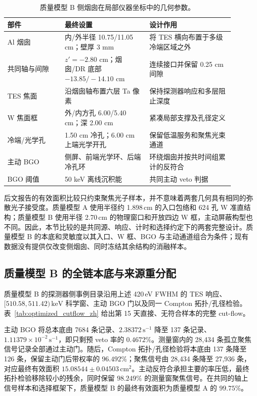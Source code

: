 \documentclass[11pt]{article}
\newcommand{\revblue}[1]{\textcolor{revisionblue}{#1}}
\newcommand{\keV}{\,\mathrm{keV}}
\newcommand{\cps}{\,\mathrm{s^{-1}}}
\begin{document}
\begin{table}[!ht]
\centering
\caption{质量模型 B 侧烟囱在局部仪器坐标中的几何参数。}
\label{tab:final_geometry_zh}
\footnotesize
\begin{tabular}{p{0.23\linewidth}p{0.34\linewidth}p{0.34\linewidth}}
\toprule
部件 & 最终设置 & 设计作用 \\
\midrule
Al 烟囱 & 内/外半径 10.75/11.05 cm；壁厚 3 mm & 将 TES 横向布置于多级冷端区域之外 \\
共同轴与间隙 & $z'=-2.80$ cm；烟囱/DR 底部 $-13.85/-14.10$ cm & 连续接口并保留 0.25 cm 间隙 \\
TES 焦面 & 沿烟囱轴布置六层 Ta 像素 & 保持探测器响应和多层阻止深度 \\
W 焦面框 & 外/内方孔 6.00/5.40 cm；深 2.00 cm & 紧凑局部支撑及孔径定义 \\
冷端/光学孔 & 1.50 cm 冷孔；6.00 cm 上端光学开孔 & 保留低温服务和聚焦光束通道 \\
主动 BGO & 侧屏、前端光学环、后端冷孔环 & 环绕烟囱并按共时间组累计的反符合 \\
BGO 阈值 & 50 keV 离线沉积能 & 共同主动 veto 判据 \\
\bottomrule
\end{tabular}
\end{table}

\revblue{后文报告的有效面积比较只约束聚焦光子样本}，并不意味着两套几何具有相同的弥散光子接受度。质量模型 A 使用半径约 1.898\,cm 的入口包络和 624 孔 W 准直结构；质量模型 B 使用半径 2.70\,cm 的物理窗口和开放四边 W 框，主动屏蔽构型也不同。因此，本节比较的是共同源、响应、计时和选择约定下的两套完整设计。质量模型 B 的本底和灵敏度以其入口、W 框、BGO 与主动通道组合为条件；现有数据没有提供仅改变侧烟囱、同时冻结其余结构的消融样本。

\FloatBarrier

\subsection{质量模型 B 的全链本底与来源重分配}
\label{subsec:optimized_fullchain_zh}

质量模型 B 的探测器侧事例目录沿用上述 420\,eV FWHM 的 TES 响应、$[510.58,511.42)\keV$ 科学窗、主动 BGO 门以及同一 Compton 拓扑/孔径检验。表~\ref{tab:optimized_cutflow_zh} 给出第 15 天直接、无符合样本的完整 cut-flow。

主动 BGO 将总本底由 7684 条记录、$2.38372\cps$ 降至 137 条记录、$1.11379\times10^{-2}\cps$，即只剩预 veto 率的 $0.4672\%$。测量窗内的 28,434 条孤立聚焦信号记录全部通过主动门。随后，Compton 拓扑/孔径检验将本底由 137 条降至 126 条，保留主动门后带权率的 $96.492\%$；聚焦信号由 28,434 条降至 27,936 条，对应最终有效面积 $15.08544\pm0.04503\,\mathrm{cm^2}$。主动反符合承担主要的率压低，最终拓扑检验移除较小的残余，同时保留 $98.249\%$ 的测量窗聚焦信号。\revblue{在共同的轴上信号样本和选择框架下，质量模型 B 的最终有效面积为质量模型 A 的 $99.75\%$。}
\end{document}
